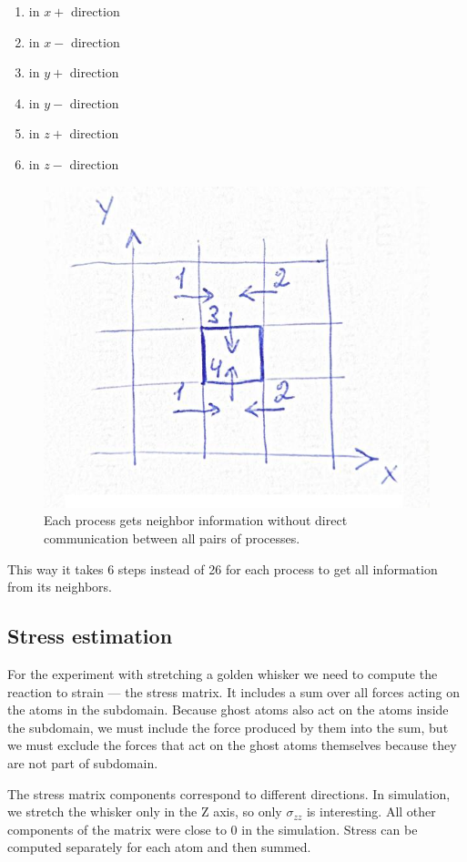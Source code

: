\documentclass[12pt,a4paper]{article}
\begin{document}
\begin{enumerate}
	\item in $x+$ direction
	\item in $x-$ direction
	\item in $y+$ direction
	\item in $y-$ direction
	\item in $z+$ direction
	\item in $z-$ direction
\end{enumerate}

\begin{figure}[h!]
	\centering
	\includegraphics[width=.5\linewidth]{img/milestone08-domain-communication.jpg}
	\caption{Each process gets neighbor information without direct communication between all pairs of processes.}
	\label{fig:domain-communication}
\end{figure}

This way it takes 6 steps instead of 26 for each process to get all information from its neighbors.

\subsection*{Stress estimation}

For the experiment with stretching a golden whisker we need to compute the reaction to strain --- the stress matrix. It includes a sum over all forces acting on the atoms in the subdomain. Because ghost atoms also act on the atoms inside the subdomain, we must include the force produced by them into the sum, but we must exclude the forces that act on the ghost atoms themselves because they are not part of subdomain.

The stress matrix components correspond to different directions. In simulation, we stretch the whisker only in the Z axis, so only $\sigma_{zz}$ is interesting. All other components of the matrix were close to 0 in the simulation. Stress can be computed separately for each atom and then summed.
\end{document}
